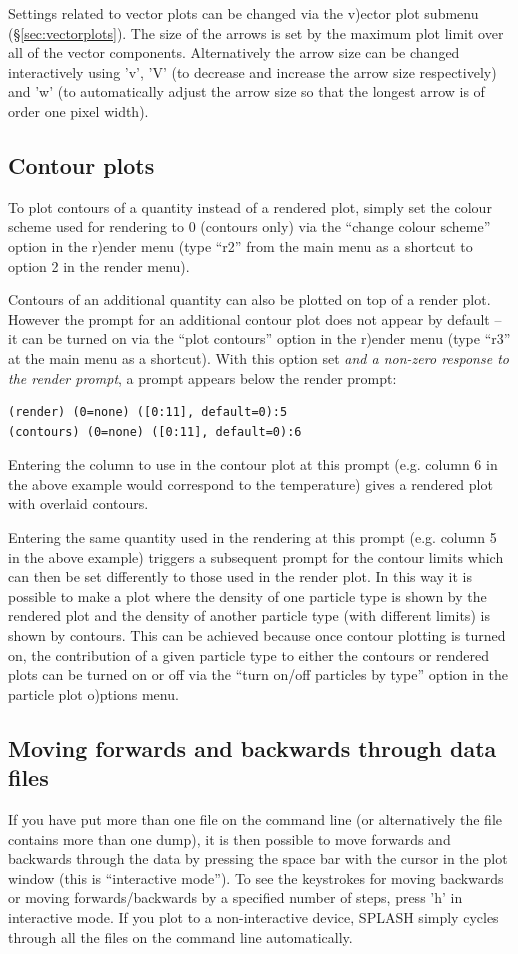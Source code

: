 \documentclass[a4paper,10pt]{article}
\newcommand{\splash}{\textsc{SPLASH }}
\begin{document}
 Settings related to vector plots can be changed via the v)ector plot submenu (\S\ref{sec:vectorplots}). The size of the arrows is set by the maximum plot limit over all of the vector components. Alternatively the arrow size can be changed interactively using 'v', 'V' (to decrease and increase the arrow size respectively) and 'w' (to automatically adjust the arrow size so that the longest arrow is of order one pixel width). 

\subsection{Contour plots}
 To plot contours of a quantity instead of a rendered plot, simply set the colour scheme used for rendering to 0 (contours only) via the ``change colour scheme'' option in the r)ender menu (type ``r2'' from the main menu as a shortcut to option 2 in the render menu).

  Contours of an additional quantity can also be plotted on top of a render plot. However the prompt for an additional contour plot does not appear by default -- it can be turned on via the ``plot contours'' option in the r)ender menu (type ``r3'' at the main menu as a shortcut). With this option set \emph{and a non-zero response to the render prompt}, a prompt appears below the render prompt:
\begin{verbatim}
(render) (0=none) ([0:11], default=0):5
(contours) (0=none) ([0:11], default=0):6
\end{verbatim}
 Entering the column to use in the contour plot at this prompt (e.g. column 6 in the above example would correspond to the temperature) gives a rendered plot with overlaid contours.

Entering the same quantity used in the rendering at this prompt (e.g. column 5 in the above example) triggers a subsequent prompt for the contour limits which can then be set differently to those used in the render plot. In this way it is possible to make a plot where the density of one particle type is shown by the rendered plot and the density of another particle type (with different limits) is shown by contours. This can be achieved because once contour plotting is turned on, the contribution of a given particle type to either the contours or rendered plots can be turned on or off via the ``turn on/off particles by type'' option in the particle plot o)ptions menu.

\subsection{Moving forwards and backwards through data files}
 If you have put more than one file on the command line (or alternatively the file contains more than one dump), it is then possible to move forwards and backwards through the data by pressing the space bar with the cursor in the plot window (this is ``interactive mode''). To see the keystrokes for moving backwards or moving forwards/backwards by a specified number of steps, press 'h' in interactive mode. If you plot to a non-interactive device, \splash simply cycles through all the files on the command line automatically.
\end{document}
